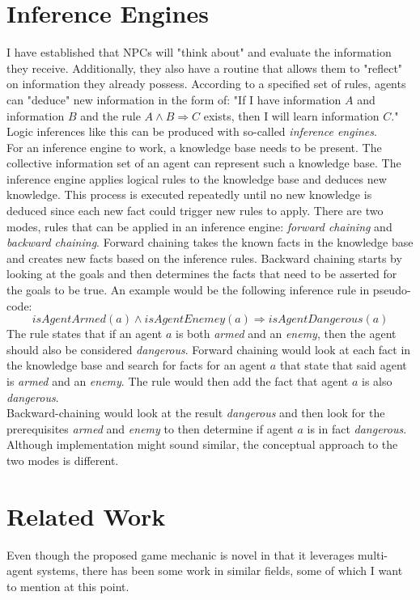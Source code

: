 \section{Inference Engines}
I have established that NPCs will "think about" and evaluate the information they receive. Additionally, they also have a routine that allows them to "reflect" on information they already possess. According to a specified set of rules, agents can "deduce" new information in the form of: "If I have information $A$ and information $B$ and the rule $A \wedge B \Rightarrow C$ exists, then I will learn information $C$." Logic inferences like this can be produced with so-called \textit{inference engines}.~\cite{Hayes1983}\\
For an inference engine to work, a knowledge base needs to be present. The collective information set of an agent can represent such a knowledge base. The inference engine applies logical rules to the knowledge base and deduces new knowledge. This process is executed repeatedly until no new knowledge is deduced since each new fact could trigger new rules to apply. There are two modes, rules that can be applied in an inference engine: \textit{forward chaining} and \textit{backward chaining}. Forward chaining takes the known facts in the knowledge base and creates new facts based on the inference rules. Backward chaining starts by looking at the goals and then determines the facts that need to be asserted for the goals to be true. An example would be the following inference rule in pseudo-code:
\begin{equation}
	\textit{isAgentArmed}(a) \wedge \textit{isAgentEnemey}(a) \Rightarrow \textit{isAgentDangerous}(a)
\end{equation}
The rule states that if an agent $a$ is both \textit{armed} and an \textit{enemy}, then the agent should also be considered \textit{dangerous}. Forward chaining would look at each fact in the knowledge base and search for facts for an agent $a$ that state that said agent is \textit{armed} and an \textit{enemy}. The rule would then add the fact that agent $a$ is also \textit{dangerous}.\\
Backward-chaining would look at the result \textit{dangerous} and then look for the prerequisites \textit{armed} and \textit{enemy} to then determine if agent $a$ is in fact \textit{dangerous}. Although implementation might sound similar, the conceptual approach to the two modes is different.~\cite{Feigenbaum1981}
\section{Related Work}
Even though the proposed game mechanic is novel in that it leverages multi-agent systems, there has been some work in similar fields, some of which I want to mention at this point.
